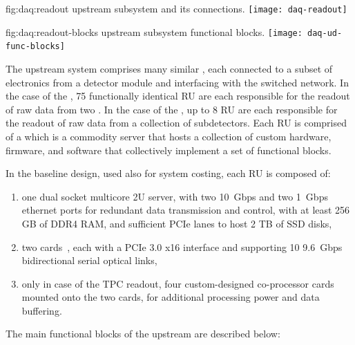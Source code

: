 \begin{dunefigure}{fig:daq:readout}{ upstream  subsystem and its connections.}
  \texttt{[image: daq-readout]}
\end{dunefigure}

\begin{dunefigure}{fig:daq:readout-blocks}{ upstream
     subsystem functional blocks.}
  \texttt{[image: daq-ud-func-blocks]}
\end{dunefigure}

The upstream  system comprises many similar , each
connected to a subset of electronics from a detector module and
interfacing with the  switched network. In the case of the
, 75 functionally identical RU are each responsible for the readout of raw data from two
. In the case of the , up to 8 RU are each responsible for the
readout of raw data from a collection of  subdetectors. 
Each RU is comprised of a  which is a commodity server that hosts a
collection of custom hardware, 
firmware, and software that collectively implement a set of functional blocks.

In the baseline design, used also for system costing, each RU is composed of:
\begin{enumerate}
\item one dual socket multicore 2U server, with two \SI{10}{Gbps} and two \SI{1}{Gbps} ethernet ports for redundant data transmission and control, with at least 256 GB of DDR4 RAM, and sufficient PCIe lanes to host 2 TB of SSD disks,
\item two  cards~\cite{atlas-felix}, each with a PCIe 3.0 x16 interface and supporting 10 \SI{9.6}{Gbps} bidirectional serial optical links,
\item only in case of the TPC readout, four custom-designed co-processor cards mounted onto the two  cards, for additional processing power and data buffering.

\end{enumerate}

The main functional blocks of the upstream  are described below:

